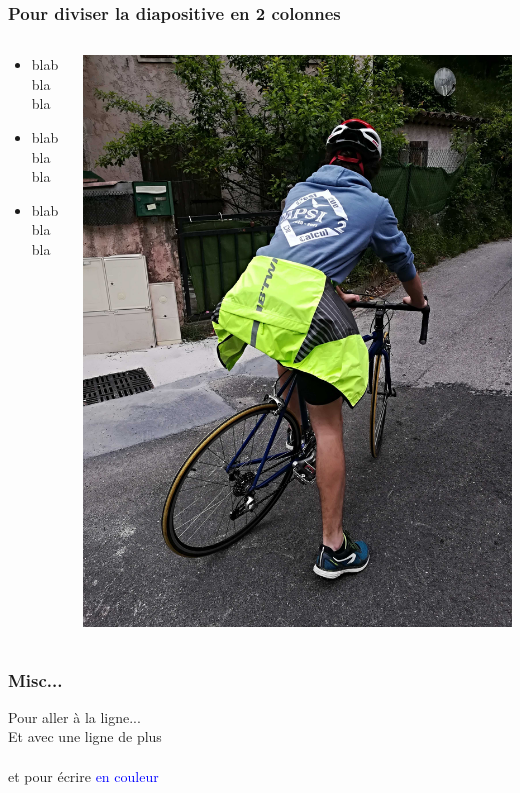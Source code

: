 \documentclass{beamer}
\begin{document}
\begin{frame}
  \frametitle{Pour diviser la diapositive en 2 colonnes}
  \begin{columns}
    \begin{column}{0.5\textwidth}
      \begin{itemize}
      \item blab bla bla
      \item blab bla bla
      \item blab bla bla
      \end{itemize}
    \end{column}

    \begin{column}{0.5\textwidth}
      \includegraphics[scale=0.05]{image.jpg}
    \end{column}
  \end{columns}
\end{frame}

\begin{frame}
  \frametitle{Misc...}
  Pour aller à la ligne...\\
  Et avec une ligne de plus \\ \ \\
  et pour écrire \textcolor{blue}{en couleur} %
\end{frame}
\end{document}
